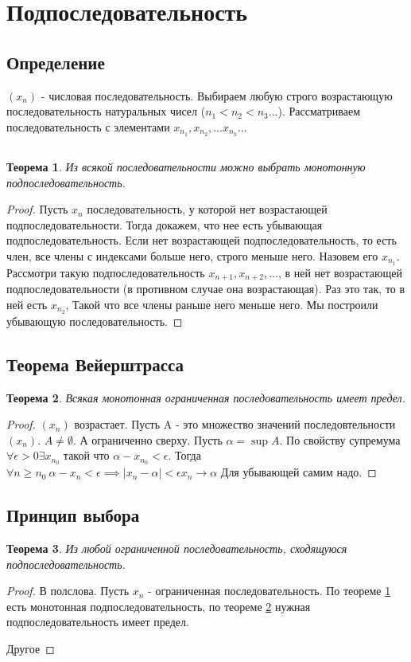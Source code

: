 \documentclass[a4paper]{article}
\newtheorem{theorem}{Теорема}
\begin{document}
\section{Подпоследовательность}
\subsection{Определение}
$(x_n)$ - числовая последовательность. Выбираем любую строго возрастающую последовательность натуральных чисел ($n_1 < n_2  < n_3 \dots $). Рассматриваем последовательность с элементами $x_{n_1}, x_{n_2}, \dots x_{n_{k}} \dots$
\subsection{}
\begin{theorem} \label{1}
    Из всякой последовательности можно выбрать монотонную подпоследовательность.
\end{theorem}
\begin{proof}

   Пусть $x_n$ последовательность, у которой нет возрастающей подпоследовательности. Тогда 
   докажем, что нее есть убывающая подпоследовательность. Если нет возрастающей подпоследовательность, то
   есть член, все члены с индексами больше него, строго меньше него. Назовем его $x_{n_1}$.
   Рассмотри такую подпоследовательность $x_{n +1} , x_{n + 2},\dots$, в ней нет возрастающей подпоследовательности (в противном случае она возрастающая). Раз это так, то в ней есть  $x_{n_2}$, Такой что все члены раньше него меньше него. Мы построили убывающую последовательность.
\end{proof}
\subsection{Теорема Вейерштрасса}
\begin{theorem} \label{weir}
    Всякая монотонная ограниченная последовательность имеет предел.
\end{theorem}
\begin{proof}
    $(x_n)$ возрастает. Пусть A - это множество значений последовтельности  $(x_n)$. $A \neq \emptyset$.
    А ограниченно сверху. Пусть $\alpha = \sup{A}$. По свойству супремума  $\forall \epsilon > 0 \exists x_{n_0}$ такой что $\alpha - x_{n_0} < \epsilon$. Тогда  $\forall  n\ge n_0 ~ \alpha -x_{n} < \epsilon \implies \mid x_n -\alpha \mid < \epsilon x_n \to \alpha$
    Для убывающей самим надо.
\end{proof}
\subsection{Принцип выбора}
\begin{theorem}
    Из любой ограниченной последовательность, сходящуюся подпоследовательность.
\end{theorem}
\begin{proof}
    В полслова. Пусть $x_n$ - ограниченная последовательность. По теореме \ref{1} есть монотонная подпоследовательность, по теореме \ref{weir} нужная подпоследовательность имеет предел.

    Другое
\end{proof}
\end{document}
